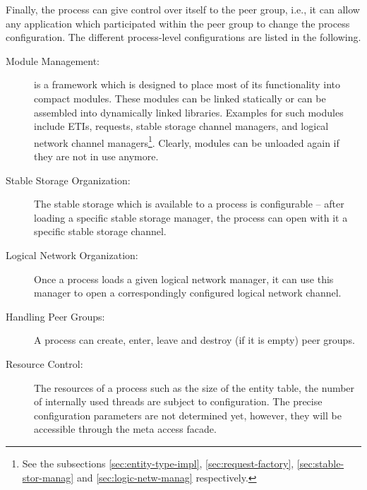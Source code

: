 \documentclass[a4paper, 10pt]{book}
\begin{document}
                                Finally, the process can give control over itself to the peer group,
                                i.e., it can allow any application which participated within the peer
                                group to change the process configuration. The different process-level
                                configurations are listed in the following.

                                \begin{description}
                                    \item[Module Management:] \SYNEIGHT is a framework which is designed to
                                        place most of its functionality into compact modules. These modules
                                        can be linked statically or can be assembled into dynamically linked
                                        libraries. Examples for such modules include ETIs, requests, stable
                                        storage channel managers, and logical network channel
                                        managers\footnote{See the subsections \vref{sec:entity-type-impl},
                                        \vref{sec:request-factory}, \vref{sec:stable-stor-manag} and
                                        \vref{sec:logic-netw-manag} respectively.}. Clearly, modules can
                                        be unloaded again if they are not in use anymore.
                                    \item[Stable Storage Organization:] The stable storage which is
                                        available to a process is configurable -- after loading a specific
                                        stable storage manager, the process can open with it a specific 
                                        stable storage channel.
                                    \item[Logical Network Organization:] Once a process loads a given
                                        logical network manager, it can use this manager to open a
                                        correspondingly configured logical network channel.
                                    \item[Handling Peer Groups:] A process can create, enter, leave and
                                        destroy (if it is empty) peer groups. 
                                    \item[Resource Control:] The resources of a process such as the size
                                        of the entity table, the number of internally used threads are
                                        subject to configuration. The precise configuration parameters are
                                        not determined yet, however, they will be accessible through the
                                        meta access facade.
                                \end{description}
\end{document}
